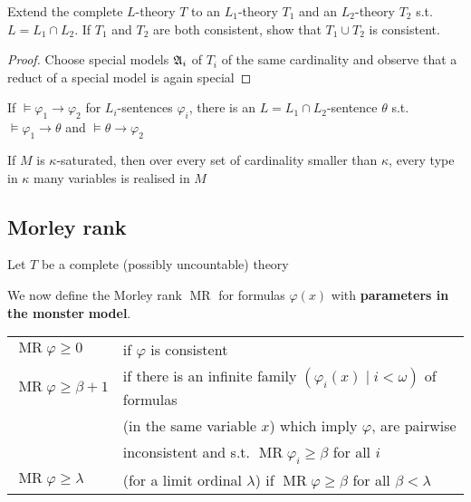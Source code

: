 \documentclass[11pt]{article}
\DeclareMathOperator{\MR}{MR}
\begin{document}
\begin{exercise}
\label{ex6.1.3}
Extend the complete \(L\)-theory \(T\) to an \(L_1\)-theory \(T_1\) and
an \(L_2\)-theory \(T_2\) s.t. \(L=L_1\cap L_2\). If \(T_1\) and \(T_2\) are both consistent, show
that \(T_1\cup T_2\) is consistent.
\end{exercise}

\begin{proof}
Choose special models \(\mathfrak{A}_i\) of \(T_i\) of the same cardinality and observe that a reduct of a
special model is again special
\end{proof}

\begin{exercise}
\label{ex6.1.4}
If \(\vDash\varphi_1\to\varphi_2\) for \(L_i\)-sentences \(\varphi_i\), there is an \(L=L_1\cap L_2\)-sentence \(\theta\) s.t. \(\vDash\varphi_1\to\theta\)
and \(\vDash\theta\to\varphi_2\)
\end{exercise}

\begin{exercise}
If \(M\) is \(\kappa\)-saturated, then over every set of cardinality smaller than \(\kappa\), every type in \(\kappa\) many
variables is realised in \(M\)
\end{exercise}

\subsection{Morley rank}
\label{sec:org792e2b9}
Let \(T\) be a complete (possibly uncountable) theory

We now define the Morley rank \(\MR\) for formulas \(\varphi(x)\) with \textbf{parameters in the monster}
\textbf{model}.

\begin{center}
\begin{tabular}{ll}
\(\MR\varphi\ge 0\) & if \(\varphi\) is consistent\\
\(\MR\varphi\ge\beta+1\) & if there is an infinite family \((\varphi_i(x)\mid i<\omega)\) of formulas\\
 & (in the same variable \(x\)) which imply \(\varphi\), are pairwise\\
 & inconsistent and s.t. \(\MR\varphi_i\ge\beta\) for all \(i\)\\
\(\MR\varphi\ge\lambda\) & (for a limit ordinal \(\lambda\)) if \(\MR\varphi\ge\beta\) for all \(\beta<\lambda\)\\
\end{tabular}
\end{center}
\end{document}
